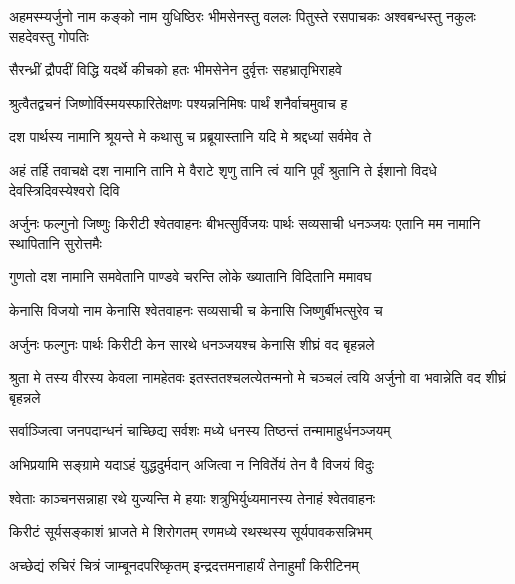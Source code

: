 \threelineshloka
{अहमस्म्यर्जुनो नाम कङ्को नाम युधिष्ठिरः}
{भीमसेनस्तु वललः पितुस्ते रसपाचकः}
{अश्वबन्धस्तु नकुलः सहदेवस्तु गोपतिः}


\twolineshloka
{सैरन्ध्रीं द्रौपदीं विद्धि यदर्थे कीचको हतः}
{भीमसेनेन दुर्वृत्तः सहभ्रातृभिराहवे}


\twolineshloka
{श्रुत्वैतद्वचनं जिष्णोर्विस्मयस्फारितेक्षणः}
{पश्यन्ननिमिषः पार्थं शनैर्वाचमुवाच ह}




\twolineshloka
{दश पार्थस्य नामानि श्रूयन्ते मे कथासु च}
{प्रब्रूयास्तानि यदि मे श्रद्दध्यां सर्वमेव ते}




\threelineshloka
{अहं तर्हि तवाचक्षे दश नामानि तानि मे}
{वैराटे शृणु तानि त्वं यानि पूर्वं श्रुतानि ते}
{ईशानो विदधे देवस्त्रिदिवस्येश्वरो दिवि}


\threelineshloka
{अर्जुनः फल्गुनो जिष्णुः किरीटी श्वेतवाहनः}
{बीभत्सुर्विजयः पार्थः सव्यसाची धनञ्जयः}
{एतानि मम नामानि स्थापितानि सुरोत्तमैः}




\twolineshloka
{गुणतो दश नामानि समवेतानि पाण्डवे}
{चरन्ति लोके ख्यातानि विदितानि ममावघ}


\twolineshloka
{केनासि विजयो नाम केनासि श्वेतवाहनः}
{सव्यसाची च केनासि जिष्णुर्बीभत्सुरेव च}


\twolineshloka
{अर्जुनः फल्गुनः पार्थः किरीटी केन सारथे}
{धनञ्जयश्च केनासि शीघ्रं वद बृहन्नले}


\threelineshloka
{श्रुता मे तस्य वीरस्य केवला नामहेतवः}
{इतस्ततश्चलत्येतन्मनो मे चञ्चलं त्वयि}
{अर्जुनो वा भवान्नेति वद शीघ्रं बृहन्नले}




\twolineshloka
{सर्वाञ्जित्वा जनपदान्धनं चाच्छिद्य सर्वशः}
{मध्ये धनस्य तिष्ठन्तं तन्मामाहुर्धनञ्जयम्}


\twolineshloka
{अभिप्रयामि सङ्ग्रामे यदाऽहं युद्धदुर्मदान्}
{अजित्वा न निविर्तेयं तेन वै विजयं विदुः}


\twolineshloka
{श्वेताः काञ्चनसन्नाहा रथे युज्यन्ति मे हयाः}
{शत्रुभिर्युध्यमानस्य तेनाहं श्वेतवाहनः}


\twolineshloka
{किरीटं सूर्यसङ्काशं भ्राजते मे शिरोगतम्}
{रणमध्ये रथस्थस्य सूर्यपावकसन्निभम्}


\twolineshloka
{अच्छेद्यं रुचिरं चित्रं जाम्बूनदपरिष्कृतम्}
{इन्द्रदत्तमनाहार्यं तेनाहुर्मां किरीटिनम्}


